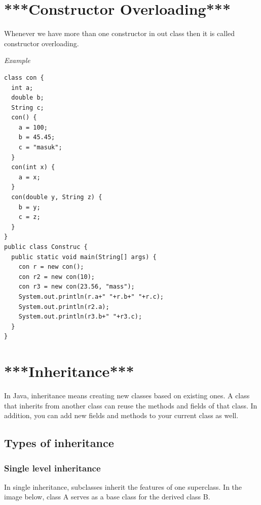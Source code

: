 \documentclass[twocolumn, a4paper]{article}
\begin{document}
\section{***Constructor Overloading***}
Whenever we have more than one constructor in out class then it is called
constructor overloading.

\noindent\emph{Example}
\begin{lstlisting}
class con {
  int a;
  double b;
  String c;
  con() {
    a = 100;
    b = 45.45;
    c = "masuk";
  }
  con(int x) {
    a = x;
  }
  con(double y, String z) {
    b = y;
    c = z;
  }
}
public class Construc {
  public static void main(String[] args) {
    con r = new con();
    con r2 = new con(10);
    con r3 = new con(23.56, "mass");
    System.out.println(r.a+" "+r.b+" "+r.c);
    System.out.println(r2.a);
    System.out.println(r3.b+" "+r3.c);
  }
}
\end{lstlisting}

\section{***Inheritance***}
In Java, inheritance means creating new classes based on existing ones. A
class that inherits from another class can reuse the methods and fields of
that class. In addition, you can add new fields and methods to your current
class as well.
\subsection{Types of inheritance}
\subsubsection{Single level inheritance}
In single inheritance, subclasses inherit the features of one superclass. In
the image below, class A serves as a base class for the derived class B.
\end{document}
